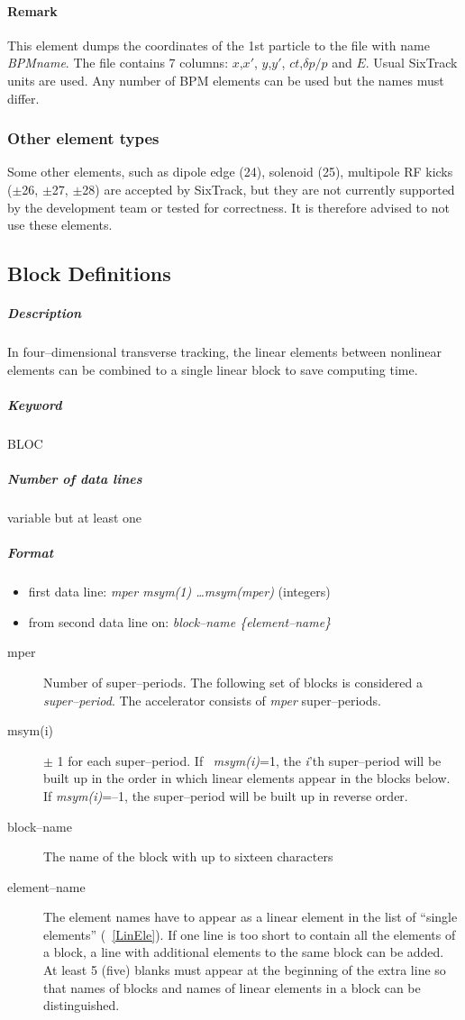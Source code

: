 \documentclass[a4paper,11pt]{report}
\begin{document}
\paragraph{Remark}
This element dumps the coordinates of the 1st particle to the file with name {\em BPMname}.
The file contains 7 columns: $x$,$x'$, $y$,$y'$, $ct$,$\delta p/p$ and $E$.
Usual SixTrack units are used. Any number of BPM elements can be used but
the names must differ. 

\subsubsection{Other element types}

Some other elements, such as dipole edge (24), solenoid (25), multipole RF kicks ($\pm$26, $\pm$27, $\pm$28) are accepted by SixTrack, but they are not currently supported by the development team or tested for correctness.
It is therefore advised to not use these elements.

\subsection{Block Definitions} \label{BloDef}

\subparagraph{Description} In four--dimensional transverse tracking,
the linear elements between nonlinear elements can be combined to a
single linear block to save computing time.

\subparagraph{Keyword} BLOC \subparagraph{Number of data lines}
variable but at least one

\subparagraph{Format}
\begin{itemize}
\item first data line: {\em mper msym(1) \dots msym(mper)}
  \/(integers)
\item from second data line on: {\em block--name \{element--name\} }
\end{itemize}

\begin{description}
\item [mper] Number of super--periods. The following set of blocks is
  considered a {\em super--period}\/. The accelerator consists of {\em
    mper} \/super--periods.
\item [msym(i)] $\pm$ 1 for each super--period.  If \mbox{{\em
      msym(i)}=1,} \/the \mbox{{\em i}\/'th} super--period will be
  built up in the order in which linear elements appear in the blocks
  below. If {\em msym(i)}\/=--1, the super--period will be built up in
  reverse order.
\item [block--name] The name of the block with up to sixteen
  characters
\item [element--name] The element names have to appear as a linear
  element in the list of ``single elements'' (~\ref{LinEle}). If one
  line is too short to contain all the elements of a block, a line
  with additional elements to the same block can be added.  At least 5
  (five) blanks must appear at the beginning of the extra line so that
  names of blocks and names of linear elements in a block can be
  distinguished.
\end{description}
\end{document}
